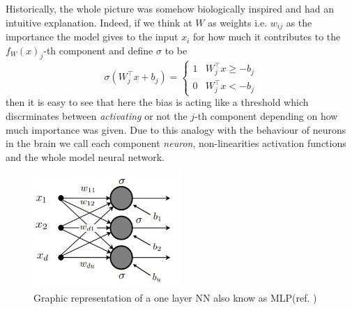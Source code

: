 \documentclass[LaM,binding=0.6cm]{./packages/sapthesis/sapthesis}
\begin{document}
            Historically, the whole picture was somehow biologically inspired and had an intuitive explanation. Indeed, if we think at $ W $ as weights i.e. $ w_{ij} $ as the importance
            the model gives to the input $x_i$ for how much it contributes to the $ f_{W}\left(x\right)_j $-th component and define $ \sigma $ to be
            \begin{equation}
                \label{step}
                \sigma(W_j^{\intercal} x + b_j) = \begin{cases} 
                    1 & W_j^{\intercal}x \geq - b_j \\
                    0 & W_j^{\intercal}x < - b_j 
                \end{cases}  
            \end{equation}
            then it is easy to see that here the bias is acting like a threshold which discrminates between \textit{activating} or not the $j$-th component depending on how much importance was given. 
            Due to this analogy with the behaviour of neurons in the brain we call each component \textit{neuron}, non-linearities activation functions and the whole model neural network.
            \begin{figure}[h]
                \centering
                \includegraphics[width=0.5\textwidth]{slide1}
                \caption{Graphic representation of a one layer NN also know as MLP(ref. )}
            \end{figure}
\end{document}
